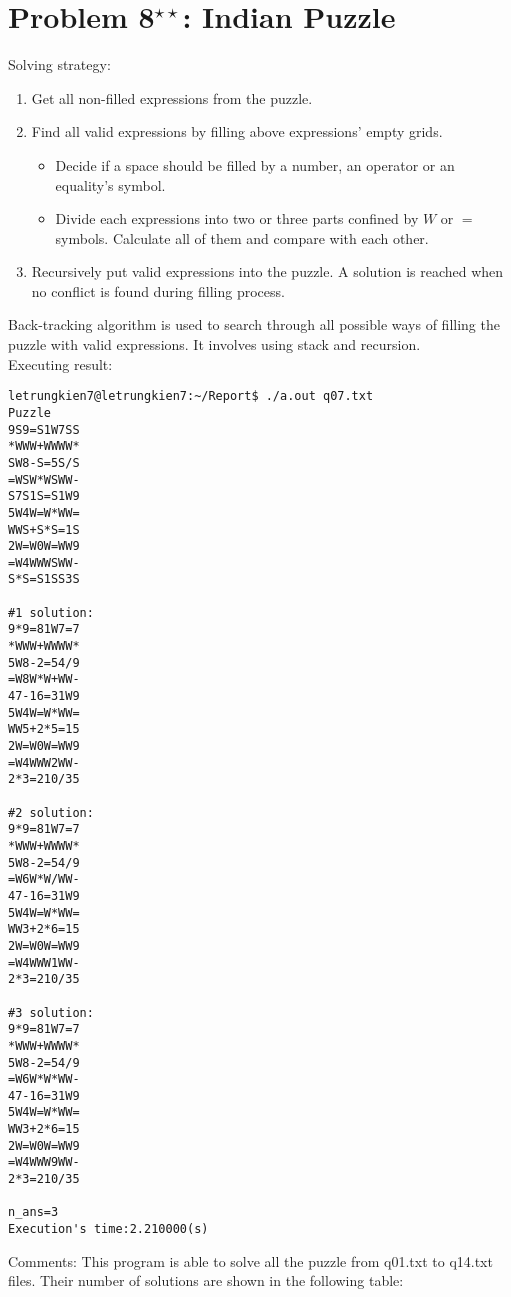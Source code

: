 \documentclass[11pt]{article}
\begin{document}
\section{Problem 8${}^{\star\star}$: \normalsize Indian Puzzle}
\indent Solving strategy:
\begin{enumerate}
\item Get all non-filled expressions from the puzzle.
\item Find all valid expressions by filling above expressions' empty grids. 
\begin{itemize}
\item Decide if a space should be filled by a number, an operator or an equality's symbol.
\item Divide each expressions into two or three parts confined by $W$ or $=$ symbols. Calculate all of them and compare with each other.
\end{itemize}
\item Recursively put valid expressions into the puzzle. A solution is reached when no conflict is found during filling process.
\end{enumerate}
\indent Back-tracking algorithm is used to search through all possible ways of filling the puzzle with valid expressions. It involves using stack and recursion. \\
Executing result:
\begin{verbatim}
letrungkien7@letrungkien7:~/Report$ ./a.out q07.txt 
Puzzle
9S9=S1W7SS
*WWW+WWWW*
SW8-S=5S/S
=WSW*WSWW-
S7S1S=S1W9
5W4W=W*WW=
WWS+S*S=1S
2W=W0W=WW9
=W4WWWSWW-
S*S=S1SS3S

#1 solution:
9*9=81W7=7
*WWW+WWWW*
5W8-2=54/9
=W8W*W+WW-
47-16=31W9
5W4W=W*WW=
WW5+2*5=15
2W=W0W=WW9
=W4WWW2WW-
2*3=210/35

#2 solution:
9*9=81W7=7
*WWW+WWWW*
5W8-2=54/9
=W6W*W/WW-
47-16=31W9
5W4W=W*WW=
WW3+2*6=15
2W=W0W=WW9
=W4WWW1WW-
2*3=210/35

#3 solution:
9*9=81W7=7
*WWW+WWWW*
5W8-2=54/9
=W6W*W*WW-
47-16=31W9
5W4W=W*WW=
WW3+2*6=15
2W=W0W=WW9
=W4WWW9WW-
2*3=210/35

n_ans=3
Execution's time:2.210000(s)
\end{verbatim}
Comments: This program is able to solve all the puzzle from q01.txt to q14.txt files. Their number of solutions are shown in the following table:
\end{document}
